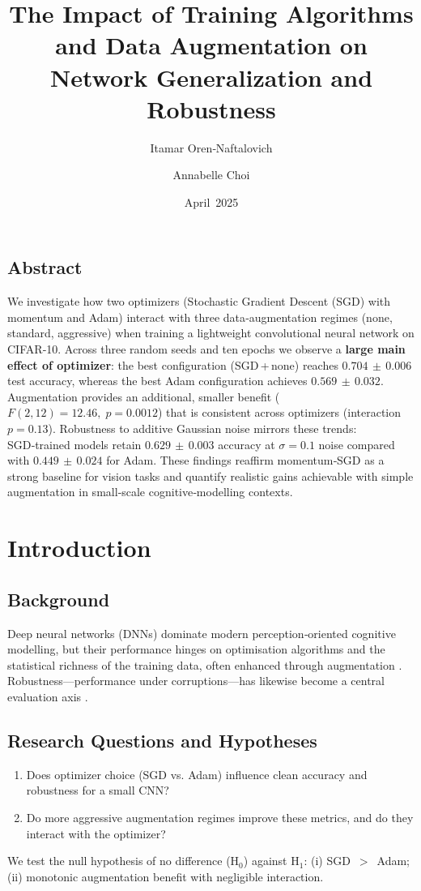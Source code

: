 \documentclass{article}
\title{The Impact of Training Algorithms and Data Augmentation on Network Generalization and Robustness}
\author{Itamar Oren‑Naftalovich \and Annabelle Choi}
\date{April~2025}
\begin{document}
\maketitle

\subsection*{Abstract}
We investigate how two optimizers (Stochastic Gradient Descent (SGD) with momentum and Adam) interact with three data‑augmentation regimes (none, standard, aggressive) when training a lightweight convolutional neural network on CIFAR‑10. Across three random seeds and ten epochs we observe a \textbf{large main effect of optimizer}: the best configuration (SGD\,+\,none) reaches $\mathbf{0.704\,\pm\,0.006}$ test accuracy, whereas the best Adam configuration achieves $0.569\,\pm\,0.032$. Augmentation provides an additional, smaller benefit ($F(2,12)=12.46,\;p=0.0012$) that is consistent across optimizers (interaction $p=0.13$). Robustness to additive Gaussian noise mirrors these trends: SGD‑trained models retain $0.629\,\pm\,0.003$ accuracy at $\sigma=0.1$ noise compared with $0.449\,\pm\,0.024$ for Adam. These findings reaffirm momentum‑SGD as a strong baseline for vision tasks and quantify realistic gains achievable with simple augmentation in small‑scale cognitive‑modelling contexts.

\section{Introduction}

\subsection{Background}
Deep neural networks (DNNs) dominate modern perception‑oriented cognitive modelling, but their performance hinges on optimisation algorithms \cite{kingma2015adam, sutskever2013importance} and the statistical richness of the training data, often enhanced through augmentation \cite{shorten2019survey}. Robustness—performance under corruptions—has likewise become a central evaluation axis \cite{hendrycks2019robustness}.

\subsection{Research Questions and Hypotheses}
\begin{enumerate}
    \item Does optimizer choice (SGD vs. Adam) influence clean accuracy and robustness for a small CNN?
    \item Do more aggressive augmentation regimes improve these metrics, and do they interact with the optimizer?
\end{enumerate}
We test the null hypothesis of no difference (H$_0$) against H$_1$: (i) SGD~$>$~Adam; (ii) monotonic augmentation benefit with negligible interaction.
\end{document}
